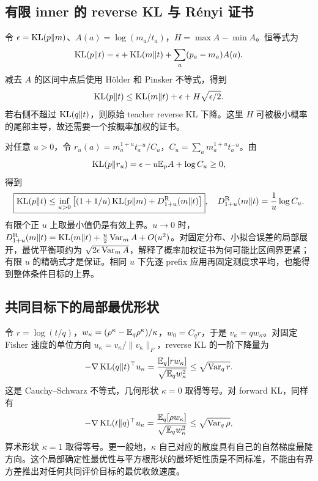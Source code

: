 \subsection{有限 inner 的 reverse KL 与 Rényi 证书}

令 $\epsilon=\operatorname{KL}(p\Vert m)$、$A(a)=\log(m_a/t_a)$，$H=\max A-\min A$。恒等式为
\begin{equation}
 \operatorname{KL}(p\Vert t)=\epsilon+\operatorname{KL}(m\Vert t)+\sum_a(p_a-m_a)A(a).
\end{equation}
减去 $A$ 的区间中点后使用 Hölder 和 Pinsker 不等式，得到
\begin{equation}
 \operatorname{KL}(p\Vert t)\le\operatorname{KL}(m\Vert t)+\epsilon+H\sqrt{\epsilon/2}.
 \label{eq:proximal-range-certificate}
\end{equation}
若右侧不超过 $\operatorname{KL}(q\Vert t)$，则原始 teacher reverse KL 下降。这里 $H$ 可被极小概率的尾部主导，故还需要一个按概率加权的证书。

对任意 $u>0$，令 $r_u(a)=m_a^{1+u}t_a^{-u}/C_u$，$C_u=\sum_am_a^{1+u}t_a^{-u}$。由
\begin{equation}
 \operatorname{KL}(p\Vert r_u)=\epsilon-u\mathbb E_pA+\log C_u\ge0,
\end{equation}
得到
\begin{equation}
 \boxed{\operatorname{KL}(p\Vert t)\le
 \inf_{u>0}\left[(1+1/u)\operatorname{KL}(p\Vert m)+D_{1+u}^{\mathrm R}(m\Vert t)\right]},\quad
 D_{1+u}^{\mathrm R}(m\Vert t)=\frac1u\log C_u.
 \label{eq:proximal-renyi-certificate}
\end{equation}
有限个正 $u$ 上取最小值仍是有效上界。$u\to0$ 时，$D_{1+u}^{\mathrm R}(m\Vert t)=\operatorname{KL}(m\Vert t)+\tfrac u2\operatorname{Var}_mA+O(u^2)$。对固定分布、小拟合误差的局部展开，最优平衡项约为 $\sqrt{2\epsilon\operatorname{Var}_mA}$，解释了概率加权证书为何可能比区间界更紧；有限 $u$ 的精确式才是保证。相同 $u$ 下先逐 prefix 应用再固定测度求平均，也能得到整体条件目标的上界。

\subsection{共同目标下的局部最优形状}

令 $r=\log(t/q)$，$w_\kappa=(\rho^\kappa-\mathbb E_q\rho^\kappa)/\kappa$，$w_0=C_qr$，于是 $v_\kappa=qw_\kappa$。对固定 Fisher 速度的单位方向 $u_\kappa=v_\kappa/\|v_\kappa\|_F$，reverse KL 的一阶下降量为
\begin{equation}
 -\nabla\operatorname{KL}(q\Vert t)^\top u_\kappa
 =\frac{\mathbb E_q[rw_\kappa]}{\sqrt{\mathbb E_qw_\kappa^2}}
 \le\sqrt{\operatorname{Var}_qr}.
\end{equation}
这是 Cauchy--Schwarz 不等式，几何形状 $\kappa=0$ 取得等号。对 forward KL，同样有
\begin{equation}
 -\nabla\operatorname{KL}(t\Vert q)^\top u_\kappa
 =\frac{\mathbb E_q[\rho w_\kappa]}{\sqrt{\mathbb E_qw_\kappa^2}}
 \le\sqrt{\operatorname{Var}_q\rho},
\end{equation}
算术形状 $\kappa=1$ 取得等号。更一般地，$\kappa$ 自己对应的散度具有自己的自然梯度最陡方向。这个局部确定性最优性与平方根形状的最坏矩性质是不同标准，不能由有界方差推出对任何共同评价目标的最优收敛速度。


